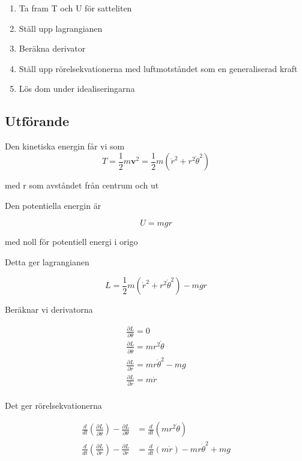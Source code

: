 \documentclass[a4paper]{article}
\begin{document}
\begin{enumerate}
    \item Ta fram T och U för satteliten
    \item Ställ upp lagrangianen
    \item Beräkna derivator
    \item Ställ upp rörelsekvationerna med luftmotståndet som en generaliserad kraft
    \item Lös dom under idealiseringarna
\end{enumerate}

\subsection*{Utförande} 

Den kinetiska energin får vi som
\begin{equation}
    T = \frac{1}{2}m\mathbf{v}^2 = \frac{1}{2}m(\dot{r}^2+r^2\dot{\theta}^2)
\end{equation}

med r som avståndet från centrum och ut

Den potentiella energin är 

\begin{equation}
    U = mgr
\end{equation}

med noll för potentiell energi i origo

Detta ger lagrangianen

\begin{equation}
    L = \frac{1}{2}m(\dot{r}^2+r^2\dot{\theta}^2) - mgr
\end{equation}

Beräknar vi derivatorna

\begin{align}
    \frac{\partial L}{\partial \theta} = 0 \\
    \frac{\partial L}{\partial \dot{\theta}} = mr^2\dot{\theta} \\
    \frac{\partial L}{\partial r} =  mr\dot{\theta}^2 - mg\\
    \frac{\partial L}{\partial \dot{r}} = m\dot{r}\\
\end{align}

Det ger rörelsekvationerna

\begin{align}
    \frac{d}{dt}(\frac{\partial L}{\partial \dot{\theta}}) - \frac{\partial L}{\partial \theta} &= \frac{d}{dt}(mr^2\dot{\theta}) \\
    \frac{d}{dt}(\frac{\partial L}{\partial \dot{r}}) - \frac{\partial L}{\partial r} &= \frac{d}{dt}(m\dot{r}) - mr\dot{\theta}^2 + mg
\end{align}
\end{document}
